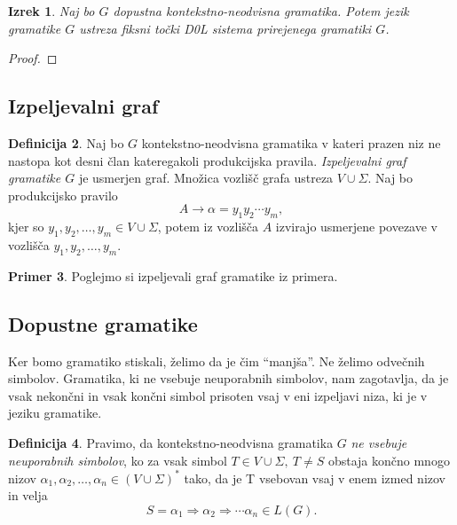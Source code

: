 \documentclass{amsart}
\theoremstyle{definition}
\newtheorem{definicija}{Definicija}[section]
\newtheorem{primer}[definicija]{Primer}
\theoremstyle{plain} %
\newtheorem{izrek}[definicija]{Izrek}
\begin{document}
\begin{izrek}

    Naj bo $G$ dopustna kontekstno-neodvisna gramatika. Potem jezik gramatike $G$ ustreza fiksni točki D0L sistema prirejenega gramatiki $G$.

\end{izrek}

\begin{proof}

\end{proof}

\subsection*{Izpeljevalni graf}

\begin{definicija}
    
    Naj bo $G$ kontekstno-neodvisna gramatika v kateri prazen niz ne nastopa kot desni član kateregakoli
    produkcijska pravila. \textit{Izpeljevalni graf gramatike $G$ } je usmerjen graf. Množica vozlišč grafa ustreza 
    $ V \cup \Sigma $. Naj bo produkcijsko pravilo
    \[    
        A \rightarrow \alpha = y_1 y_2 \cdots y_m,
    \]
    kjer so $ y_1, y_2, \ldots, y_m \in V \cup \Sigma $, potem iz vozlišča $ A $ izvirajo usmerjene povezave
    v vozlišča $ y_1, y_2, \ldots, y_m $.

\end{definicija}

\begin{primer}
    Poglejmo si izpeljevali graf gramatike iz primera.
    \begin{figure}[h]
        \centering
        \begin{tikzpicture}

        \end{tikzpicture}
    \end{figure}
\end{primer}

\subsection*{Dopustne gramatike}

Ker bomo gramatiko stiskali, želimo da je čim ``manjša''. Ne želimo odvečnih simbolov. Gramatika, ki ne vsebuje neuporabnih
simbolov, nam zagotavlja, da je vsak nekončni in vsak končni simbol prisoten vsaj v eni izpeljavi niza, ki je v jeziku gramatike.

\begin{definicija}
    
    Pravimo, da kontekstno-neodvisna gramatika $G$ \textit{ne vsebuje neuporabnih simbolov}, ko za vsak simbol
    $ T \in V \cup \Sigma, \ T \neq S $ obstaja končno mnogo nizov $ \alpha_1, \alpha_2, \ldots, \alpha_n \in 
    (V \cup \Sigma)^* $ tako, da je T vsebovan vsaj v enem izmed nizov in velja
    \[
        S = \alpha_1 \Rightarrow \alpha_2 \Rightarrow \cdots \alpha_n \in L(G).
    \]

\end{definicija}
\end{document}

